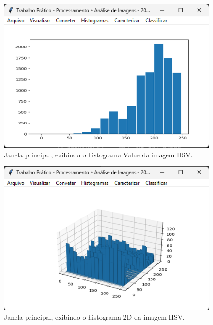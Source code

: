 \documentclass[12pt]{article}
\begin{document}
\begin{figure}
    \centering
    \includegraphics{Captura de tela 2024-06-10 095102.png}
    \caption{Janela principal, exibindo o histograma Value da imagem HSV.}
    \label{fig:janela-principal-histograma-value}
\end{figure}

\begin{figure}
    \centering
    \includegraphics{Captura de tela 2024-06-10 095121.png}
    \caption{Janela principal, exibindo o histograma 2D da imagem HSV.}
    \label{fig:janela-principal-histograma-2d-hsv}
\end{figure}
\end{document}
